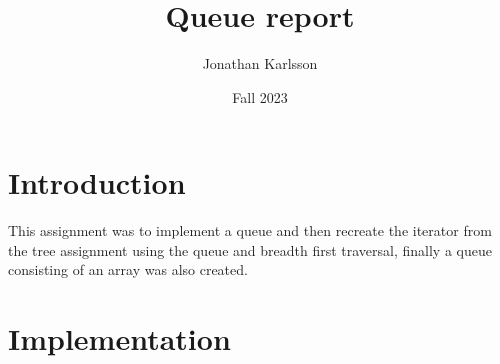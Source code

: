 \documentclass[a4paper,11pt]{article}
\begin{document}
\title{
    \textbf{Queue report}
}
\author{Jonathan Karlsson}
\date{Fall 2023}

\maketitle

\section*{Introduction}
This assignment was to implement a queue and then recreate the iterator from the tree assignment using the queue and breadth first traversal, finally a queue consisting of an array was also created.
\section*{Implementation}
\end{document}
